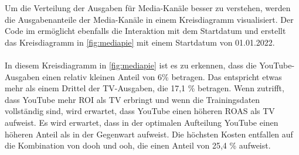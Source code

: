 Um die Verteilung der Ausgaben für Media-Kanäle besser zu verstehen, werden die Ausgabenanteile der Media-Kanäle in einem Kreisdiagramm visualisiert. Der Code im  ermöglicht ebenfalls die Interaktion mit dem Startdatum und erstellt das Kreisdiagramm in \autoref{fig:mediapie} mit einem Startdatum von 01.01.2022.\\\\
In diesem Kreisdiagramm in \autoref{fig:mediapie} ist es zu erkennen, dass die YouTube-Ausgaben einen relativ kleinen Anteil von 6\% betragen. Das entspricht etwas mehr als einem Drittel der TV-Ausgaben, die 17,1 \% betragen. Wenn  zutrifft, dass YouTube mehr \ac{ROI} als TV erbringt und wenn die Trainingsdaten vollständig sind, wird erwartet, dass YouTube einen höheren \ac{ROAS} als TV aufweist. Es wird erwartet, dass in der optimalen Aufteilung YouTube einen höheren Anteil als in der Gegenwart aufweist. Die höchsten Kosten entfallen auf die Kombination von \ac{dooh} und \ac{ooh}, die einen Anteil von 25,4 \% aufweist.
\newpage
